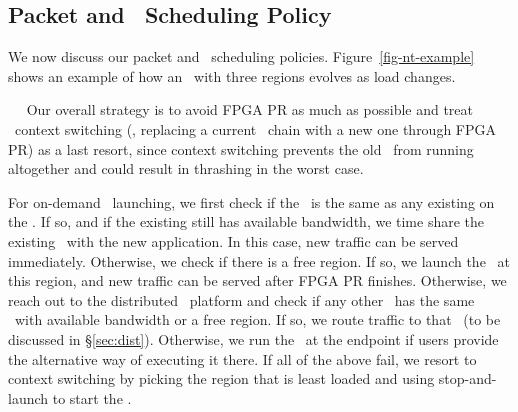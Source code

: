 \subsection{Packet and \nt\ Scheduling Policy}
\label{sec:policy}

We now discuss our packet and \nt\ scheduling policies.
Figure~\ref{fig-nt-example} shows an example of how an \snic\ with three regions evolves as load changes.

~~
Our overall strategy is to avoid FPGA PR as much as possible and treat \nt\ context switching (\ie, replacing a current \nt\ chain with a new one through FPGA PR) as a last resort, since context switching prevents the old \nt\ from running altogether and could result in thrashing in the worst case. 

For on-demand \nt\ launching, we first check if the \nt\ is the same as any existing \nt{} on the \snic.
If so, and if the existing \nt{} still has available bandwidth, we time share the existing \nt\ with the new application. %
In this case, new traffic can be served immediately.
Otherwise, we check if there is a free region.
If so, we launch the \nt\ at this region, and new traffic can be served after FPGA PR finishes.
Otherwise, we reach out to the distributed \snic\ platform and check if any other \snic\ has the same \nt\ with available bandwidth or a free region. 
If so, we route traffic to that \snic\ (to be discussed in \S\ref{sec:dist}).
Otherwise, we run the \nt\ at the endpoint if users provide the alternative way of executing it there.
If all of the above fail, we resort to context switching by picking the region that is least loaded and using stop-and-launch to start the \nt.

